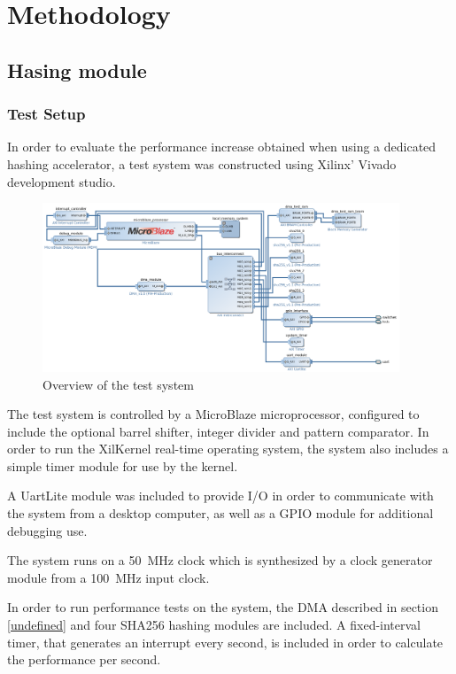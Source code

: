 \chapter{Methodology}

\section{Hasing module}

\subsection{Test Setup}
In order to evaluate the performance increase obtained when using a dedicated
hashing accelerator, a test system was constructed using Xilinx' Vivado
development studio.

\begin{figure}[ht]
	\includegraphics[width=0.95\textwidth]{Figures/testsystem-vivado.png}
	\caption{Overview of the test system}
	\label{fig:testsystem-vivado}
\end{figure}

The test system is controlled by a MicroBlaze microprocessor, configured to
include the optional barrel shifter, integer divider and pattern comparator.
In order to run the XilKernel real-time operating system, the system also
includes a simple timer module for use by the kernel.

A UartLite module was included to provide I/O in order to communicate with
the system from a desktop computer, as well as a GPIO module for additional
debugging use.

The system runs on a 50~MHz clock which is synthesized by a clock generator
module from a 100~MHz input clock.

In order to run performance tests on the system, the DMA described in
section \ref{undefined} and four
SHA256 hashing modules are included.
A fixed-interval timer, that generates an interrupt every second, is
included in order to calculate the performance per second.

